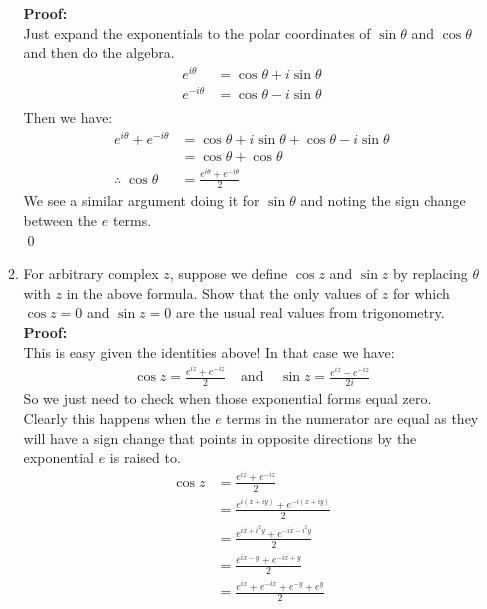 \begin{enumerate}
\begin{enumerate}
		\textbf{Proof:} \\
		Just expand the exponentials to the polar coordinates of $\sin\theta$ and $\cos\theta$ and then do the algebra. \\
		\begin{align*}
			e^{i\theta} &= \cos\theta + i\sin\theta \\
			e^{-i\theta} &= \cos\theta - i\sin\theta \\
		\end{align*}
		Then we have:
		\begin{align*}
			e^{i\theta} + e^{-i\theta} &= \cos\theta + i\sin\theta + \cos\theta - i\sin\theta \\
			&= \cos\theta + \cos\theta \\
			\therefore \; \cos\theta &=  \frac{e^{i\theta} + e^{-i\theta}}{2}
		\end{align*}
		We see a similar argument doing it for $\sin\theta$ and noting the sign change between the $e$ terms. \\
		\qed
	

		\item For arbitrary complex $z$, suppose we define $\cos{z}$ and $\sin{z}$ by replacing $\theta$ with $z$ in the above formula. 
		Show that the only values of $z$ for which $\cos{z} = 0$ and $\sin{z} = 0$ are the usual real values from trigonometry. \\
		
		\textbf{Proof:} \\
		This is easy given the identities above! In that case we have:
		\begin{align*}
			\cos{z} = \frac{e^{iz} + e^{-iz}}{2} \;\;\;\ \text{and} \;\;\;\; \sin{z} = {\frac{e^{iz} - e^{-iz}}{2i}}
		\end{align*}
		So we just need to check when those exponential forms equal zero. Clearly this happens when the $e$ terms in the numerator are equal as they will 
		have a sign change that points in opposite directions by the exponential $e$ is raised to. 
		\begin{align*}
			\cos{z} &= \frac{e^{iz} + e^{-iz}}{2} \\
			&= \frac{e^{i(x + iy)} + e^{-i(x + iy)}}{2} \\
			&= \frac{e^{ix + i^2 y} + e^{-ix - i^2 y}}{2} \\
			&= \frac{e^{ix - y} + e^{-ix + y}}{2} \\
			&= \frac{e^{ix} + e^{-ix} + e^{-y} + e^{y}}{2} \\
		\end{align*}


\end{enumerate}
\end{enumerate}
